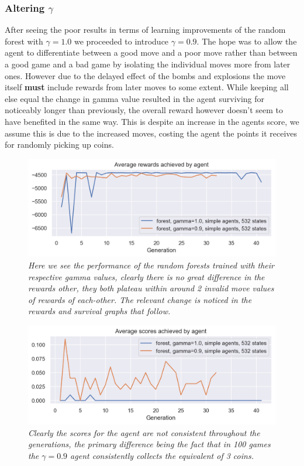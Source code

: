 \subsubsection{Altering $\gamma$}
After seeing the poor results in terms of learning improvements of the random forest with $\gamma = 1.0$ we proceeded to introduce $\gamma = 0.9$. The hope was to allow the agent to differentiate between a good move and a poor move rather than between a good game and a bad game by isolating the individual moves more from later ones. However due to the delayed effect of the bombs and explosions the move itself \textbf{must} include rewards from later moves to some extent. While keeping all else equal the change in gamma value resulted in the agent surviving for noticeably longer than previously, the overall reward however doesn't seem to have benefited in the same way. This is despite an increase in the agents score, we assume this is due to the increased moves, costing the agent the points it receives for randomly picking up coins.

\begin{figure}[!h]
\centering
	\includegraphics[width=\linewidth]{images/forest09_vs_forest1rew.png}
	\caption{\textit{Here we see the performance of the random forests trained with their respective gamma values, clearly there is no great difference in the rewards other, they both plateau within around 2 invalid move values of rewards of each-other. The relevant change is noticed in the rewards and survival graphs that follow.}}
	\label{forest09_vs_forest1rew}
\end{figure}

\begin{figure}[!h]
\centering
	\includegraphics[width=\linewidth]{images/forest09_vs_forest1sco.png}
	\caption{\textit{Clearly the scores for the agent are not consistent throughout the generations, the primary difference being the fact that in 100 games the $\gamma = 0.9$ agent consistently collects the equivalent of 3 coins.}}
	\label{forest09_vs_forest1sco}
\end{figure}


